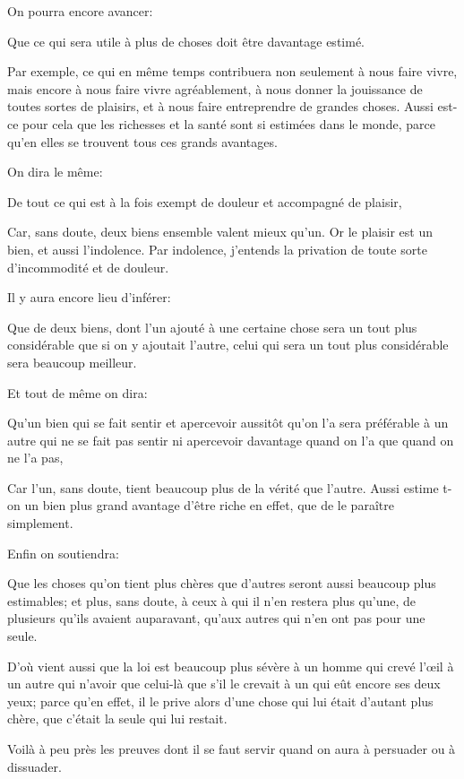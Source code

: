 \bigbreak

On pourra encore avancer:

\begin{emphpar}
  Que ce qui sera utile à plus de choses doit être davantage estimé.
\end{emphpar}

Par exemple, ce qui en même temps contribuera non seulement à nous faire vivre, mais encore à nous faire vivre agréablement,
à nous donner la jouissance de toutes sortes de plaisirs, et à nous faire entreprendre de grandes choses. Aussi est-ce pour
cela que les richesses et la santé sont si estimées dans le monde, parce qu'en elles se trouvent tous ces grands avantages.

\bigbreak

On dira le même:

\begin{emphpar}
  De tout ce qui est à la fois exempt de douleur et accompagné de plaisir,
\end{emphpar}

Car, sans doute, deux biens ensemble valent mieux qu'un. Or le plaisir est un bien, et aussi l'indolence. Par indolence,
j'entends la privation de toute sorte d'incommodité et de douleur.

\bigbreak

Il y aura encore lieu d'inférer:

\begin{emphpar}
  Que de deux biens, dont l'un ajouté à une certaine chose sera un tout plus considérable que si on y ajoutait l'autre,
  celui qui sera un tout plus considérable sera beaucoup meilleur.
\end{emphpar}

Et tout de même on dira:

\begin{emphpar}
  Qu'un bien qui se fait sentir et apercevoir aussitôt qu'on l'a sera préférable à un autre qui ne se fait pas sentir ni
  apercevoir davantage quand on l'a que quand on ne l'a pas,
\end{emphpar}

Car l'un, sans doute, tient beaucoup plus de la vérité que l'autre. Aussi estime t-on un bien plus grand avantage d'être
riche en effet, que de le paraître simplement.

\bigbreak

Enfin on soutiendra:

\begin{emphpar}
  Que les choses qu'on tient plus chères que d'autres seront aussi beaucoup plus estimables; et plus, sans doute, à ceux à
  qui il n'en restera plus qu'une, de plusieurs qu'ils avaient auparavant, qu'aux autres qui n'en ont pas pour une seule.
\end{emphpar}

D'où vient aussi que la loi est beaucoup plus sévère à un homme qui crevé l'œil à un autre qui n'avoir que celui-là que s'il
le crevait à un qui eût encore ses deux yeux; parce qu'en effet, il le prive alors d'une chose qui lui était d'autant plus chère,
que c'était la seule qui lui restait.

\bigbreak

Voilà à peu près les preuves dont il se faut servir quand on aura à persuader ou à dissuader.
